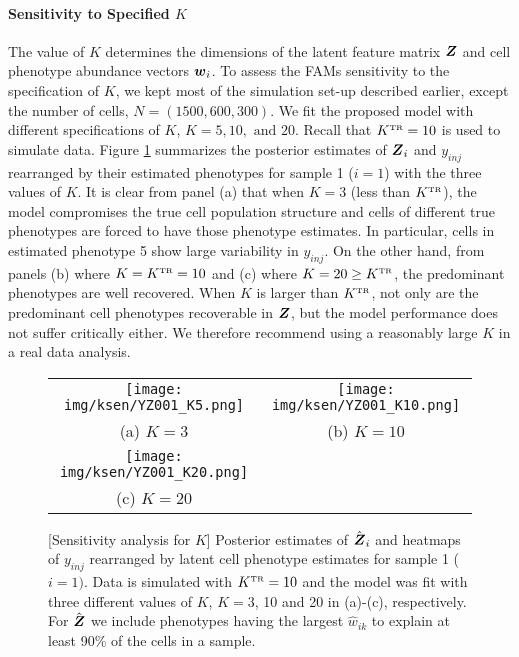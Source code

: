 \documentclass[12pt,]{article}
\newcommand{\true}{{\mbox{\tiny TR}}}
\newcommand{\bZ}{\mbox{\boldmath $Z$}}
\newcommand{\bw}{\mbox{\boldmath $w$}}
\begin{document}


\paragraph*{Sensitivity to Specified $K$}
The value of $K$ determines the dimensions of the latent feature matrix $\bZ$
and cell phenotype abundance vectors $\bw_i$.  To assess the FAMs sensitivity
to the specification of $K$, we kept most of the simulation set-up described
earlier, except the number of cells, $N=(1500, 600, 300)$. We fit the proposed
model with different specifications of $K$, $K=5, 10, \text{ and } 20$. Recall
that $K^\true=10$ is used to simulate data.  Figure \ref{fig:ksen-post-Z}
summarizes the posterior estimates of $\bZ_i$ and $y_{inj}$ rearranged by their
estimated phenotypes for sample 1 ($i=1$) with the three values of $K$. It is
clear from panel (a) that when $K=3$ (less than $K^\true$), the model
compromises the true cell population structure and cells of different true
phenotypes are forced to have those phenotype estimates. In particular, cells
in estimated phenotype 5 show large variability in $y_{inj}$.  On the other
hand, from panels (b) where $K=K^\true=10$ and (c) where $K=20 \geq K^\true$,
the predominant phenotypes are well recovered. 
When $K$ is larger than $K^\true$, not only are the predominant cell phenotypes
recoverable in $\bZ$, but the model performance does not suffer critically
either. We therefore recommend using a reasonably large $K$ in a real data
analysis.

\begin{figure}[H]
\begin{center}
  \begin{tabular}{cc}
  \texttt{[image: img/ksen/YZ001\_K5.png]}&
  \texttt{[image: img/ksen/YZ001\_K10.png]}\\
  {\small (a) $K=3$} & {\small (b) $K=10$} \\
  \texttt{[image: img/ksen/YZ001\_K20.png]}& \\
  {\small (c) $K=20$} &\\
  \end{tabular}
  \vspace{-0.05in}
  \caption{\small[Sensitivity analysis for $K$] Posterior estimates of
    $\hat{\bZ}_i$ and heatmaps of $y_{inj}$ rearranged by latent cell phenotype
    estimates for sample 1 ($i=1)$. Data is simulated with $K^\true=10$ and the
    model was fit with three different values of $K$, $K=3$, 10 and 20 in
    (a)-(c), respectively.  For $\hat{\bZ}$ we include phenotypes having the
    largest $\hat{w}_{ik}$ to explain at least 90\% of the cells in a sample. }
  \label{fig:ksen-post-Z}
\end{center}
\end{figure}
\end{document}
